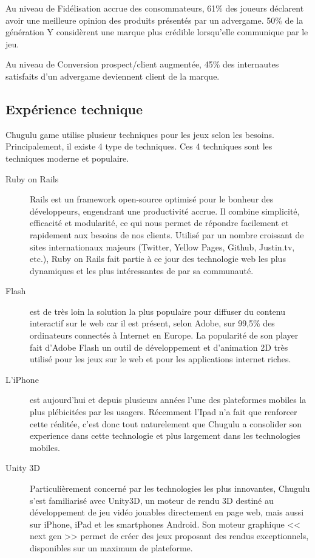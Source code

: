 Au niveau de Fidélisation accrue des consommateurs, 61\% des joueurs déclarent avoir une meilleure opinion des produits présentés par un advergame. 50\% de la génération Y considèrent une marque plus crédible lorsqu'elle communique par le jeu.

Au niveau de Conversion prospect/client augmentée, 45\% des internautes satisfaits d’un advergame deviennent client de la marque.




\subsection{Expérience technique} %
\label{ssub:expérience_technique}

Chugulu game utilise plusieur techniques pour les jeux selon les besoins. Principalement, il existe 4 type de techniques. Ces 4 techniques sont les techniques moderne et populaire. 

\begin{description}
	\item[Ruby on Rails] Rails est un framework open-source optimisé pour le bonheur des développeurs, engendrant une productivité accrue. Il combine simplicité, efficacité et modularité, ce qui nous permet de répondre facilement et rapidement aux besoins de nos clients. Utilisé par un nombre croissant de sites internationaux majeurs (Twitter, Yellow Pages, Github, Justin.tv, etc.), Ruby on Rails fait partie à ce jour des technologie web les plus dynamiques et les plus intéressantes de par sa communauté.
	\item[Flash] est de très loin la solution la plus populaire pour diffuser du contenu interactif sur le web car il est présent, selon Adobe, sur 99,5\% des ordinateurs connectés à Internet en Europe. La popularité de son player fait d’Adobe Flash un outil de développement et d’animation 2D très utilisé pour les jeux sur le web et pour les applications internet riches.
	\item[L'iPhone] est aujourd'hui et depuis plusieurs années l'une des plateformes mobiles la plus plébicitées par les usagers. Récemment l'Ipad n'a fait que renforcer cette réalitée, c'est donc tout naturelement que Chugulu a consolider son experience dans cette technologie et plus largement dans les technologies mobiles.
	\item[Unity 3D] Particulièrement concerné par les technologies les plus innovantes, Chugulu s’est familiarisé avec Unity3D, un moteur de rendu 3D destiné au développement de jeu vidéo jouables directement en page web, mais aussi sur iPhone, iPad et les smartphones Android. Son moteur graphique << next gen >> permet de créer des jeux proposant des rendus exceptionnels, disponibles sur un maximum de plateforme.
\end{description}




